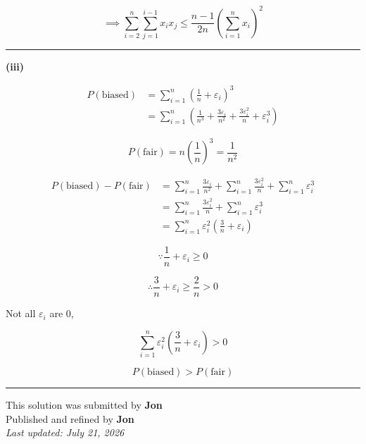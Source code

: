 \documentclass[12pt]{article}
\begin{document}
$$\implies \sum_{i=2}^n\sum_{j=1}^{i-1}x_ix_j\leq
\frac{n-1}{2n}\left(\sum_{i=1}^n x_i\right)^2$$

\bigskip\hrule\bigskip
\textbf{(iii)}

\begin{align*}
P(\text{biased})
&=\sum_{i=1}^n\left(\frac1n+\varepsilon_i\right)^3\\
&=\sum_{i=1}^n\left(\frac1{n^3}+\frac{3\varepsilon_i}{n^2}
+\frac{3\varepsilon_i^2}{n}+\varepsilon_i^3\right)
\end{align*}


$$P(\text{fair})=n\left(\frac1n\right)^3=\frac1{n^2}$$

\begin{align*}
P(\text{biased})-P(\text{fair})&=\sum_{i=1}^n\frac{3\varepsilon_i}{n^2}
+\sum_{i=1}^n\frac{3\varepsilon_i^2}{n}
+\sum_{i=1}^n\varepsilon_i^3\\
&=\sum_{i=1}^n\frac{3\varepsilon_i^2}{n}+\sum_{i=1}^n\varepsilon_i^3\\
&=\sum_{i=1}^n\varepsilon_i^2\left(\frac3n+\varepsilon_i\right)
\end{align*}

$$\because \frac1n+\varepsilon_i\geq0$$

$$\therefore \frac3n+\varepsilon_i\geq\frac2n>0$$

Not all $\varepsilon_i$ are $0$,

$$\sum_{i=1}^n\varepsilon_i^2\left(\frac3n+\varepsilon_i\right)>0$$

$$P(\text{biased})>P(\text{fair})$$

\bigskip
\hrule
\begin{center}
    This solution was submitted by \textbf{Jon}\\[4pt]
    Published and refined by \textbf{Jon}\\[8pt]
    \textit{Last updated: July 21, 2026}
\end{center}
\end{document}
